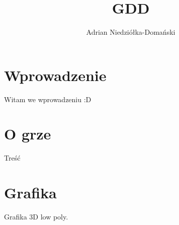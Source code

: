 \documentclass[12pt]{article}
\author{Adrian Niedziółka-Domański}
\title {GDD}
\begin{document}
	\maketitle
	\pagebreak
	\tableofcontents
	\pagebreak
	
	\section{Wprowadzenie}
	Witam we wprowadzeniu :D
	
	\section{O grze}
	Treść
	
	\section{Grafika}
	Grafika 3D low poly.
\end{document}
